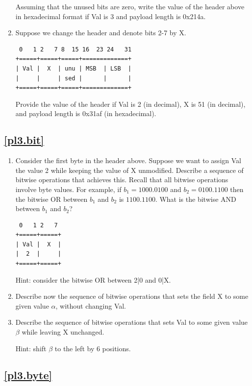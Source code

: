 \documentclass[12pt]{book}
\begin{document}
\begin{enumerate}[label=Activity \arabic*:]
Assuming that the unused bits are zero, write the value of the header above in hexadecimal format if Val is 3 and payload length is 0x214a.

\item Suppose we change the header and denote bits 2-7 by X.
\begin{verbatim}
 0   1 2   7 8  15 16  23 24   31
+=====+=====+=====+=============+
| Val |  X  | unu | MSB  | LSB  |
|     |     | sed |      |      |
+=====+=====+=====+=============+ 
\end{verbatim}

Provide the value of the header if Val is 2 (in decimal), X is 51 (in decimal), and payload length is 0x31af (in hexadecimal).
\end{enumerate}


\subsection{\ref{pl3.bit}}

\begin{enumerate}[resume*]
\item Consider the first byte in the header above. Suppose we want to assign  Val the value 2 while keeping the value of X unmodified. Describe a sequence of bitwise operations that achieves this. Recall that all bitwise operations involve byte values. For example, if $b_1 = 1000.0100$ and $b_2 = 0100.1100$ then the bitwise OR between $b_1$ and $b_2$ is $1100.1100$. What is the bitwise AND between $b_1$ and $b_2$?
\begin{verbatim}
 0   1 2   7 
+=====+=====+
| Val |  X  |
|  2  |     |
+=====+=====+
\end{verbatim}

Hint: consider the bitwise OR between 2|0 and 0|X.

\item Describe now the sequence of bitwise operations that sets the field X to some given value $\alpha$, without changing Val.

\item Describe the sequence of bitwise operations that sets Val to some given value $\beta$ while leaving X unchanged.

  Hint: shift $\beta$ to the left by 6 positions.
  
\end{enumerate}


\subsection{\ref{pl3.byte}}
\end{document}
